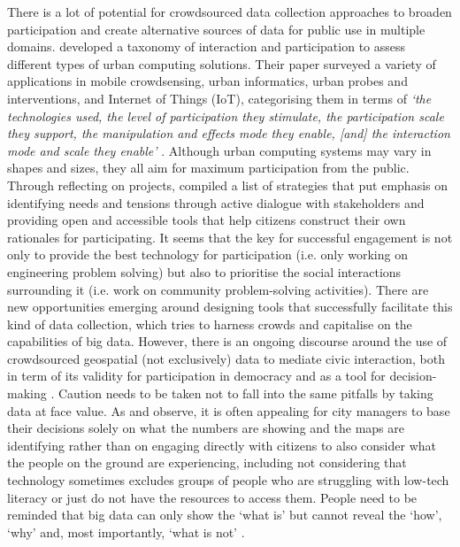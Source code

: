 There is a lot of potential for crowdsourced data collection approaches to broaden participation and create alternative sources of data for public use in multiple domains. \citet{salim_urban_2015} developed a taxonomy of interaction and participation to assess different types of urban computing solutions. Their paper surveyed a variety of applications in mobile crowdsensing, urban informatics, urban probes and interventions, and Internet of Things (IoT), categorising them in terms of \textit{`the technologies used, the level of participation they stimulate, the participation scale they support, the manipulation and effects mode they enable, [and] the interaction mode and scale they enable'} \citep[p. 44]{salim_urban_2015}. Although urban computing systems may vary in shapes and sizes, they all aim for maximum participation from the public. Through reflecting on projects, \citet{salim_urban_2015} compiled a list of strategies that put emphasis on identifying needs and tensions through active dialogue with stakeholders and providing open and accessible tools that help citizens construct their own rationales for participating. It seems that the key for successful engagement is not only to provide the best technology for participation (i.e. only working on engineering problem solving) but also to prioritise the social interactions surrounding it (i.e. work on community problem-solving activities).
There are new opportunities emerging around designing tools that successfully facilitate this kind of data collection, which tries to harness crowds and capitalise on the capabilities of big data. However, there is an ongoing discourse around the use of crowdsourced geospatial (not exclusively) data to mediate civic interaction, both in term of its validity for participation in democracy \citep{le_dantec_planning_2015} and as a tool for decision-making \citep{brabham_crowdsourcing_2009,misra_crowdsourcing_2014,tenney_data-driven_2016}. Caution needs to be taken not to fall into the same pitfalls by taking data at face value. As \cite{le_dantec_planning_2015} and \citet{kitchin_knowing_2015} observe, it is often appealing for city managers to base their decisions solely on what the numbers are showing and the maps are identifying rather than on engaging directly with citizens to also consider what the people on the ground are experiencing, including not considering that technology sometimes excludes groups of people who are struggling with low-tech literacy or just do not have the resources to access them. People need to be reminded that big data can only show the `what is' but cannot reveal the `how', `why' and, most importantly, `what is not' \citep{mayer-schonderger_big_2013}.

